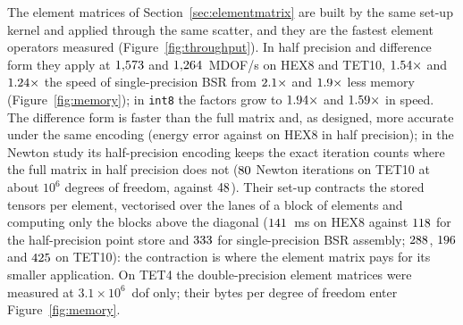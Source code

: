 \documentclass[sigconf,balance=false]{acmart}
\begin{document}
The element matrices of Section~\ref{sec:elementmatrix} are built by the same set-up kernel and
applied through the same scatter, and they are the fastest element operators measured
(Figure~\ref{fig:throughput}).  In half precision and difference form they apply at
$1{,}573$ and $1{,}264$~MDOF/s on HEX8 and TET10,
$1.54\times$ and $1.24\times$ the speed of
single-precision BSR from $2.1\times$ and
$1.9\times$ less memory (Figure~\ref{fig:memory}); in \texttt{int8} the
factors grow to $1.94\times$ and $1.59\times$ in
speed.  The difference form is faster than the full matrix and, as designed, more accurate under
the same encoding (energy error \errEaDiffHalfHexEight{} against \errEaFullHalfHexEight{} on HEX8 in
half precision); in the Newton study its half-precision encoding keeps the exact iteration counts
where the full matrix in half precision does not ($80$ Newton iterations on
TET10 at about $10^6$ degrees of freedom, against $48$).  Their set-up contracts the stored tensors per element, vectorised over the lanes of a
block of elements and computing only the blocks above the diagonal ($141$~ms on
HEX8 against $118$ for the half-precision point store and
$333$ for single-precision BSR assembly; $288$,
$196$ and $425$ on TET10): the contraction is where the element
matrix pays for its smaller application.  On TET4 the double-precision element matrices were
measured at $3.1\times10^6$~dof only; their bytes per degree of freedom enter
Figure~\ref{fig:memory}.
\end{document}
